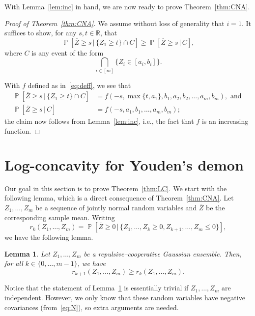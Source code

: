 \documentclass[12pt,english,reqno]{amsart}
\theoremstyle{plain}
\newtheorem{lemma}[thm]{Lemma}
\theoremstyle{remark}
\numberwithin{figure}{section}
\numberwithin{equation}{section}
\def\rr{\mathbb{R}}
\def\bZ{\overline{Z}}
\DeclareMathOperator{\Pb}{\mathbb{P}} %
\def\ar{r} %
\begin{document}
With Lemma~\ref{lem:inc} in hand, we are now ready to prove Theorem~\ref{thm:CNA}.

\begin{proof}[Proof of Theorem~\ref{thm:CNA}] We assume without loss of generality that $i=1$. It suffices to show, for any $s,t \in \rr$, that
	\[ \Pb\left[ \bZ \geq s \,\vert\, \{Z_1 \geq t\} \cap C \right] \geq \Pb\left[ \bZ \geq s \,\vert\, C \right], \]
	where $C$ is any event of the form
	\[ \bigcap_{i \in[m]} \{ Z_i \in [a_i,b_i] \}. \]

	With $f$ defined as in~\eqref{eq:deff}, we see that
	\begin{align*}
		\Pb\left[ \bZ \geq s \,\vert\, \{Z_1 \geq t\} \cap C \right] & = f(-s,\max\{t,a_1\}, b_1, a_2,b_2,\dots, a_m,b_m), \text{ and } \\
		\Pb\left[ \bZ \geq s \,\vert\, C \right]                     & = f(-s,a_1, b_1,\dots, a_m,b_m);
	\end{align*}
	the claim now follows from Lemma~\ref{lem:inc}, i.e., the fact that $f$ is an increasing function.
\end{proof}

\section{Log-concavity for Youden's demon}\label{sec:proof-LC}
Our goal in this section is to prove Theorem~\ref{thm:LC}. We start with the following lemma, which is a direct consequence of Theorem~\ref{thm:CNA}. Let $Z_1,\dots, Z_m$ be a sequence of jointly normal random variables and $\bZ$ be the corresponding sample mean. Writing
\[ \ar_k(Z_1,\dots,Z_m) = \Pb \left[ \bZ \geq 0 \,\vert\, \{Z_1,\dots, Z_k \geq 0, Z_{k+1},\dots, Z_m \leq 0\} \right], \]
we have the following lemma.

\begin{lemma}\label{lem:red-Y}
	Let $Z_1,\dots, Z_m$ be a repulsive–cooperative Gaussian ensemble. Then, for all $k \in \{0,\dots,m-1\}$, we have
	\[ \ar_{k+1}(Z_1,\dots, Z_m) \geq \ar_{k}(Z_1,\dots, Z_m). \]
\end{lemma}

Notice that the statement of Lemma~\ref{lem:red-Y} is essentially trivial if $Z_1,\dots, Z_m$ are independent. However, we only know that these random variables have negative covariances (from~\ref{eq:N}), so extra arguments are needed.
\end{document}
